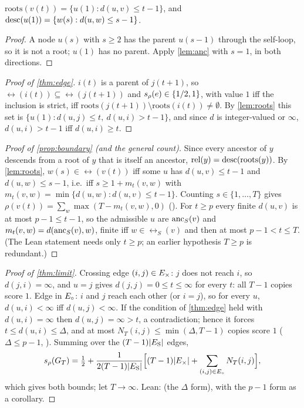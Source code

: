 \begin{lemma}[roots]\label{lem:roots}
$\mathrm{roots}(v(t))=\{u(1):d(u,v)\le t-1\}$, and
$\mathrm{desc}(u(1))=\{w(s):d(u,w)\le s-1\}$.
\end{lemma}
\begin{proof}
A node $u(s)$ with $s\ge2$ has the parent $u(s-1)$ through the self-loop, so
it is not a root; $u(1)$ has no parent. Apply \cref{lem:anc} with $s=1$, in
both directions.
\end{proof}

\begin{proof}[Proof of \cref{thm:edge}]
$i(t)$ is a parent of $j(t{+}1)$, so $\rel(i(t))\subseteq\rel(j(t{+}1))$ and
$s_\rho(e)\in\{1/2,1\}$, with value $1$ iff the inclusion is strict, iff
$\mathrm{roots}(j(t{+}1))\setminus\mathrm{roots}(i(t))\neq\emptyset$. By
\cref{lem:roots} this set is $\{u(1):d(u,j)\le t,\ d(u,i)>t-1\}$, and since
$d$ is integer-valued or $\infty$, $d(u,i)>t-1$ iff $d(u,i)\ge t$.
\end{proof}

\begin{proof}[Proof of \cref{prop:boundary} (and the general count)]
Since every ancestor of $y$ descends from a root of $y$ that is itself an
ancestor, $\mathrm{rel}(y)=\mathrm{desc}(\mathrm{roots}(y))$. By \cref{lem:roots},
$w(s)\in\rel(v(t))$ iff some $u$ has $d(u,v)\le t-1$ and $d(u,w)\le s-1$,
i.e.\ iff $s\ge1+m_t(v,w)$ with $m_t(v,w)=\min\{d(u,w):d(u,v)\le t-1\}$.
Counting $s\in\{1,\dots,T\}$ gives
$\rho(v(t))=\sum_{w}\max(T-m_t(v,w),0)$ (). For
$t\ge p$ every finite $d(u,v)$ is at most $p-1\le t-1$, so the admissible $u$
are $\mathrm{anc}_S(v)$ and $m_t(v,w)=d(\mathrm{anc}_S(v),w)$, finite iff $w\in\rel_S(v)$ and
then at most $p-1<t\le T$. (The Lean statement 
needs only $t\ge p$; an earlier hypothesis $T\ge p$ is redundant.)
\end{proof}

\begin{proof}[Proof of \cref{thm:limit}]
Crossing edge $(i,j)\in E_{\times}$: $j$ does not reach $i$, so $d(j,i)=\infty$, and
$u=j$ gives $d(j,j)=0\le t\le\infty$ for every $t$: all $T-1$ copies score
$1$. Edge in $E_{\circ}$: $i$ and $j$ reach each other (or $i=j$), so for every $u$,
$d(u,i)<\infty$ iff $d(u,j)<\infty$. If the condition of \cref{thm:edge} held
with $d(u,i)=\infty$ then $d(u,j)=\infty>t$, a contradiction; hence it forces
$t\le d(u,i)\le\Delta$, and at most $N_T(i,j)\le\min(\Delta,T-1)$ copies score
$1$ ($\Delta\le p-1$, ). Summing over the $(T-1)|E_{\mathrm S}|$ edges,
\[
s_\rho(G_T)=\tfrac12+\frac{1}{2(T-1)|E_{\mathrm S}|}\Big[(T-1)|E_{\times}|+\sum_{(i,j)\in E_{\circ}}N_T(i,j)\Big],
\]
which gives both bounds; let $T\to\infty$. Lean: 
(the $\Delta$ form), with the $p-1$ form  as a corollary.
\end{proof}

